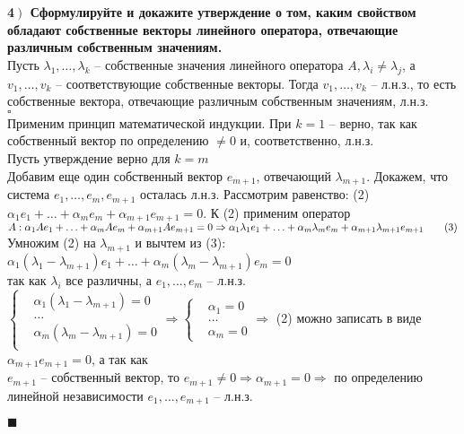 \documentclass[a4paper,12pt]{article}
\begin{document}
    \textbf{4$\left.\right)$ Сформулируйте и докажите утверждение о том, каким свойством обладают собственные векторы линейного оператора, отвечающие различным собственным значениям.}\\Пусть $\lambda_1, \ldots, \lambda_k$ -- собственные значения линейного оператора $A, \lambda_i\ne\lambda_j$, а $v_1, \ldots, v_k$ -- соответствующие собственные векторы. Тогда $v_1, \ldots, v_k$ -- л.н.з., то есть собственные вектора, отвечающие различным собственным значениям, л.н.з.\\
    $\square$\\
    Применим принцип математической индукции. При $k=1$ -- верно, так как собственный вектор по определению $\ne0$ и, соответственно, л.н.з.\\
    Пусть утверждение верно для $k=m$\\
    Добавим еще один собственный вектор $e_{m+1}$, отвечающий $\lambda_{m+1}$. Докажем, что система $e_1, \ldots, e_m, e_{m+1}$ осталась л.н.з. Рассмотрим равенство: (2) $\alpha_1e_1+\ldots+\alpha_me_m+\alpha_{m+1}e_{m+1}=0$. К (2) применим оператор $A:\alpha_1Ae_1+\ldots+\alpha_mAe_m+\alpha_{m+1}Ae_{m+1}=0\\
    \Rightarrow\alpha_1\lambda_1e_1+\ldots+\alpha_m\lambda_me_m+\alpha_{m+1}\lambda_{m+1}e_{m+1}\qquad(3)$\\
    Умножим (2) на $\lambda_{m+1}$ и вычтем из (3):\\
    $\alpha_1(\lambda_1-\lambda_{m+1})e_1+\ldots+\alpha_m(\lambda_m-\lambda_{m+1})e_m=0$\\
    так как $\lambda_i$ все различны, а $e_1, \ldots, e_m$ -- л.н.з.\\
    $\left\lbrace \begin{aligned}
                      &\alpha_1(\lambda_1-\lambda_{m+1})=0\\
                      &\ldots\\
                      &\alpha_m(\lambda_m-\lambda_{m+1})=0\\
    \end{aligned}\right. \Rightarrow\left\lbrace \begin{aligned}
                                                     &\alpha_1=0\\
                                                     &\ldots\\
                                                     &\alpha_m=0
    \end{aligned}\right. \Rightarrow$ (2) можно записать в виде $\alpha_{m+1}e_{m+1}=0$, а так как \\$e_{m+1}$ -- собственный вектор, то $e_{m+1}\ne 0\Rightarrow\alpha_{m+1}=0\Rightarrow$ по определению линейной независимости $e_1, \ldots, e_{m+1}$ -- л.н.з.
    \begin{flushright}
        $\blacksquare$
    \end{flushright}
\end{document}
